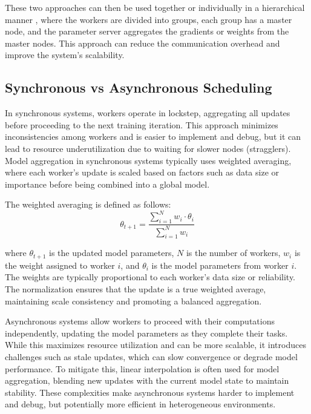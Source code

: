 These two approaches can then be used together or individually in a hierarchical manner \cite{liu2020client}, where the workers are divided into groups, each group has a master node, and the parameter server aggregates the gradients or weights from the master nodes. This approach can reduce the communication overhead and improve the system's scalability.

\subsection{Synchronous vs Asynchronous Scheduling}
\label{sec:synchronous-vs-asynchronous-scheduling}

In synchronous systems, workers operate in lockstep, aggregating all updates before proceeding to the next training iteration. This approach minimizes inconsistencies among workers and is easier to implement and debug, but it can lead to resource underutilization due to waiting for slower nodes (stragglers). Model aggregation in synchronous systems typically uses weighted averaging, where each worker's update is scaled based on factors such as data size or importance before being combined into a global model.

The weighted averaging is defined as follows:
\begin{equation}
    \theta_{t+1} = \frac{\sum_{i=1}^{N} w_i \cdot \theta_i}{\sum_{i=1}^{N} w_i}
\end{equation}

where $\theta_{t+1}$ is the updated model parameters, $N$ is the number of workers, $w_i$ is the weight assigned to worker $i$, and $\theta_i$ is the model parameters from worker $i$. The weights are typically proportional to each worker’s data size or reliability. The normalization ensures that the update is a true weighted average, maintaining scale consistency and promoting a balanced aggregation.


Asynchronous systems allow workers to proceed with their computations independently, updating the model parameters as they complete their tasks. While this maximizes resource utilization and can be more scalable, it introduces challenges such as stale updates, which can slow convergence or degrade model performance. To mitigate this, linear interpolation is often used for model aggregation, blending new updates with the current model state to maintain stability. These complexities make asynchronous systems harder to implement and debug, but potentially more efficient in heterogeneous environments.

